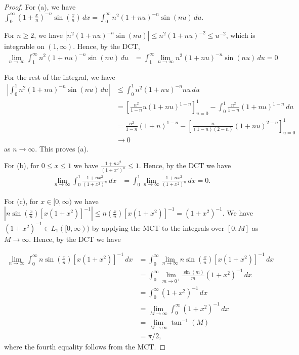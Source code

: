 \documentclass{article}
\begin{document}
\begin{proof}
For (a), we have  $\int_0^\infty \left( 1 + \frac x n \right)^{-n} \sin \left(\frac x n \right) \, dx  = \int_0^\infty n^2 ( 1 + n u )^{-n} \sin(nu) \, du$.

For $n \ge 2$, we have $\left| n^2 ( 1 + n u )^{-n} \sin(nu) \right| \le  n^2 (1 + nu)^{-2} \le u^{-2}$, which is integrable on $(1, \infty)$.  Hence, by the DCT, 
\begin{align*}
 \lim_{n\to \infty} \int_1^\infty n^2 ( 1 + n u)^{-n} \sin(nu) \, du  & = \int_1^\infty \lim_{n\to \infty} n^2 ( 1 + n u)^{-n} \sin(nu) \, du
 = 0
\end{align*}

For the rest of the integral, we have
\begin{align*}
\left| \int_0^1 n^2 ( 1 + n u)^{-n} \sin(nu) \, du \right| & \le \int_0^1 n^2 (1 + nu )^{-n} nu \, du 
\\ & = \left[ \frac{n^2}{1 - n} u (1+nu)^{1-n} \right]_{u=0}^1 - \int_0^1 \frac{n^2}{1-n} (1+nu)^{1-n} \, du
\\ & = \frac{n^2}{1-n} (1+n)^{1-n} - \left[ \frac{n}{(1-n)(2-n)} (1+nu)^{2-n} \right]_{u=0}^1
\\ & \to 0
\end{align*}
as $n \to \infty$.  This proves (a).

For (b), for $0 \le x \le 1$ we have $\frac{1 + n x^2} {(1 + x^2)^n} \le 1$. Hence, by the DCT we have
\begin{align*}
\lim_{n \to \infty} \int_0^1 \frac{1 + n x^2} {(1 + x^2)^n} \, dx & = \int_0^1 \lim_{n \to \infty} \frac{1 + n x^2} {(1 + x^2)^n} \, dx 
 = 0.
\end{align*}

For (c), for $x \in [0,\infty)$ we have $ \left| n\sin \left( \frac x n \right) [x(1+x^2)]^{-1} \right| \le n \left(\frac x n \right) [x(1+x^2)]^{-1} = (1+x^2)^{-1}$.  We have $(1+x^2)^{-1} \in L_1([0,\infty))$ by applying the MCT to the integrals over $[0,M]$ as $M \to \infty$.  Hence, by the DCT we have

\begin{align*}
\lim_{n \to \infty} \int_0^\infty n \sin \left( \frac x n \right) [x(1+x^2)]^{-1} \, dx  & = \int_0^\infty \lim_{n \to \infty} n \sin \left( \frac x n \right) [x(1+x^2)]^{-1} \, dx 
\\ & = \int_0^\infty \lim_{m \to 0^+}  \frac {\sin (m)}{m}  (1+x^2)^{-1} \, dx 
\\ & = \int_0^\infty  (1+x^2)^{-1} \, dx 
\\ & = \lim_{M \to \infty} \int_0^\infty (1+x^2)^{-1} \, dx 
\\ & = \lim_{M \to \infty} \tan^{-1}(M)
\\ & = \pi/2,
\end{align*}
where the fourth equality follows from the MCT.


\end{proof}
\end{document}
